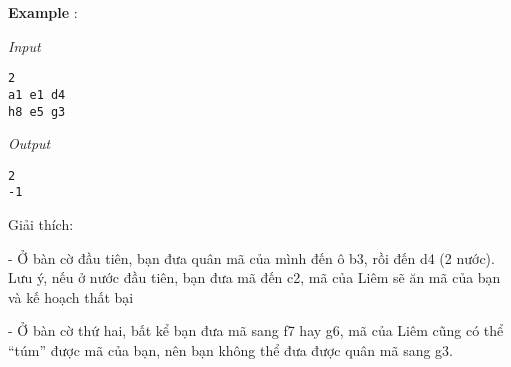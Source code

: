 \textbf{    Example   }   :  

\emph{    Input   }
\begin{verbatim}
2
a1 e1 d4
h8 e5 g3
\end{verbatim}

\emph{    Output   }
\begin{verbatim}
2
-1
\end{verbatim}



   Giải thích:  

   - Ở bàn cờ đầu tiên, bạn đưa quân mã của mình đến ô b3, rồi đến d4 (2 nước). Lưu ý, nếu ở nước đầu tiên, bạn đưa mã đến c2, mã của Liêm sẽ ăn mã của bạn và kế hoạch thất bại  

   - Ở bàn cờ thứ hai, bất kể bạn đưa mã sang f7 hay g6, mã của Liêm cũng có thể “túm” được mã của bạn, nên bạn không thể đưa được quân mã sang g3.  
